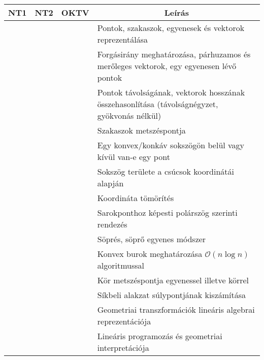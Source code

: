 \documentclass[a4paper,11pt,oneside]{article}
\newcommand{\cmark}{\ding{51}}%
\newcommand{\xmark}{\ding{55}}%
\newcommand{\cincl}{{\small\cmark}}
\newcommand{\cdefi}{{\small\cmark\faFileTextO}}
\newcommand{\ccode}{{\small\cmark\faFileText}}
\newcommand{\cemay}{{\small\xmark\faQuestionCircle}}
\newcommand{\cexcl}{{\small\xmark}}
\newcommand{\ctable}[1]{
    \begin{center}
        \begin{longtable}{ | C | C | C | m{8cm} | } %
        \hline
        \textbf{NT1} & \textbf{NT2} & \textbf{OKTV} & \multicolumn{1}{|c|}{\textbf{Leírás}} \\ \hline
        \endhead
        #1
        \end{longtable}
    \end{center}
}
\begin{document}
\ctable {
    \cexcl & \cemay & \cincl & Pontok, szakaszok, egyenesek és vektorok reprezentálása
    \\ \hline %
    \cexcl & \cemay & \cincl & Forgásirány meghatározása, párhuzamos és merőleges vektorok, egy egyenesen lévő pontok
    \\ \hline %
    \cexcl & \cemay & \cincl & Pontok távolságának, vektorok hosszának összehasonlítása (távolságnégyzet, gyökvonás nélkül)
    \\ \hline %
    \cexcl & \cemay & \cincl & Szakaszok metszéspontja
    \\ \hline %
    \cexcl & \cemay & \cincl & Egy konvex/konkáv sokszögön belül vagy kívül van-e egy pont
    \\ \hline %
    \cexcl & \cexcl & \cemay & Sokszög területe a csúcsok koordinátái alapján
    \\ \hline %
    \cexcl & \cexcl & \ccode & Koordináta tömörítés 
    \\ \hline %
    \cexcl & \cexcl & \ccode & Sarokponthoz képesti polárszög szerinti rendezés
    \\ \hline %
    \cexcl & \cexcl & \ccode & Söprés, söprő egyenes módszer
    \\ \hline %
    \cexcl & \cexcl & \cdefi & Konvex burok meghatározása $\mathcal{O}(n\log{n})$ algoritmussal
    \\ \hline %
    \cexcl & \cexcl & \cexcl & Kör metszéspontja egyenessel illetve körrel
    \\ \hline %
    \cexcl & \cexcl & \cexcl & Síkbeli alakzat súlypontjának kiszámítása
    \\ \hline %
    \cexcl & \cexcl & \cexcl & Geometriai transzformációk lineáris algebrai reprezentációja
    \\ \hline %
    \cexcl & \cexcl & \cexcl & Lineáris programozás és geometriai interpretációja
    \\ \hline %
}
\end{document}
